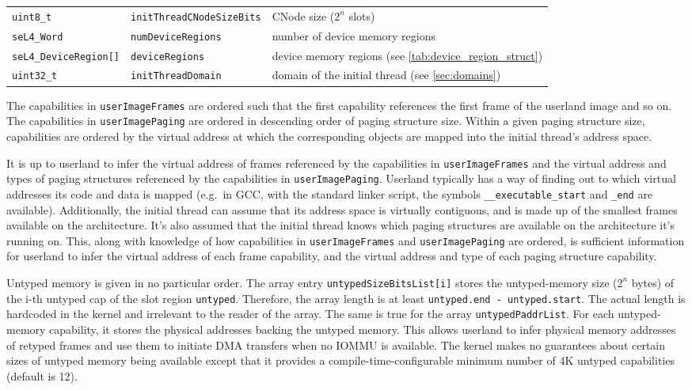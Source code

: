 \begin{table}[htb]
\begin{center}
\begin{tabularx}{\textwidth}{llX}
      \texttt{uint8\_t}             & \texttt{initThreadCNodeSizeBits} & CNode size ($2^n$ slots) \\
      \texttt{seL4\_Word}           & \texttt{numDeviceRegions}        & number of device memory regions \\
      \texttt{seL4\_DeviceRegion[]} & \texttt{deviceRegions}           & device memory regions (see \autoref{tab:device_region_struct}) \\
      \texttt{uint32\_t}            & \texttt{initThreadDomain}        & domain of the initial thread (see \autoref{sec:domains}) \\
      \bottomrule
    \end{tabularx}
  \end{center}
\end{table}

The capabilities in \texttt{userImageFrames} are
ordered such that the first capability references the first frame of the
userland image and so on.
The capabilities in \texttt{userImagePaging} are ordered in descending order
of paging structure size. Within a given paging structure size, capabilities are
ordered by the virtual address at which the corresponding objects are mapped
into the initial thread's address space.

It is up to userland to infer the virtual address of frames referenced by
the capabilities in \texttt{userImageFrames} and the virtual address and
types of paging structures
referenced by the capabilities in \texttt{userImagePaging}.
Userland typically has a way of finding out to which virtual addresses its
code and data is mapped (e.g.\ in GCC, with the standard linker script, the
symbols \texttt{\_\_executable\_start} and \texttt{\_end} are available).
Additionally, the initial thread can assume that its address space is virtually
contiguous, and is made up of the smallest frames available on the architecture.
It's also assumed that the initial thread knows which paging structures are
available on the architecture it's running on.
This, along with knowledge of how capabilities in \texttt{userImageFrames} and
\texttt{userImagePaging} are ordered, is sufficient information for userland to infer
the virtual address of each
frame capability, and the virtual address and type of each paging structure capability.

Untyped memory is given in no particular order. The array entry
\texttt{untypedSizeBitsList[i]} stores the untyped-memory size ($2^n$ bytes) of
the i-th untyped cap of the slot region \texttt{untyped}. Therefore, the array
length is at least \texttt{untyped.end - untyped.start}. The actual length is
hardcoded in the kernel and irrelevant to the reader of the array.
The same is true for the array \texttt{untypedPaddrList}. For each
untyped-memory capability, it stores the physical addresses backing the
untyped memory. This allows
userland to infer physical memory addresses of retyped frames and use them to
initiate DMA transfers when no IOMMU is available. The kernel makes no
guarantees about certain sizes of untyped memory being available except that it
provides a compile-time-configurable minimum number of 4K untyped capabilities
(default is 12).

